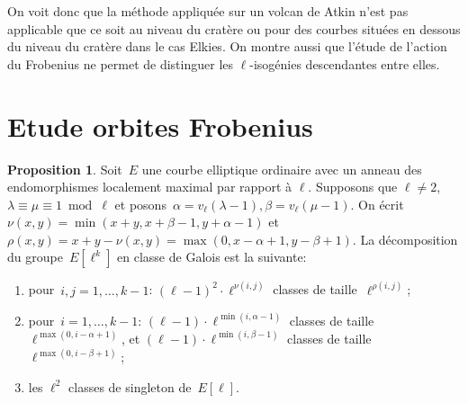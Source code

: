\documentclass[10pt,a4paper]{book}
\theoremstyle{plain}
\theoremstyle{definition}
\theoremstyle{definition}
\theoremstyle{definition}
\newtheorem{prop}[thm]{Proposition}
\theoremstyle{definition}
\theoremstyle{remark}
\theoremstyle{remark}
\theoremstyle{definition}
\begin{document}
On voit donc que la méthode appliquée sur un volcan de Atkin n'est pas 
applicable que ce soit au niveau du cratère ou pour des courbes situées en 
dessous du niveau du cratère dans le cas Elkies. On montre aussi que l'étude de
l'action du Frobenius ne permet de distinguer les $\ell$-isogénies descendantes
entre elles.

\section{Etude orbites Frobenius}
\begin{prop}\label{prop:orbites-l-torsion}
Soit~$E$ une courbe elliptique ordinaire avec un anneau des endomorphismes 
localement maximal  par rapport à $\ell$.
Supposons que $\ell \neq 2$, $\lambda \equiv \mu \equiv 1 \bmod \ell$ et posons~$\alpha = v_{\ell}(\lambda-1), \beta=v_{\ell}(\mu-1)$.
On écrit~$\nu(x, y) = \min (x+y, x+\beta-1, y+\alpha-1)$
et~$\rho(x, y) = x+y - \nu(x, y) = \max (0, x-\alpha+1, y-\beta+1)$.
La décomposition du groupe~$E[\ell^k]$ en classe de Galois est la suivante:
\begin{enumerate}
\item pour~$i, j = 1, …, k-1$:
$(\ell-1)^2 \cdot \ell^{\nu(i,j)}$ classes de taille~$\ell^{\rho(i,j)}$;
\item pour~$i = 1, …, k-1$:
$(\ell-1) \cdot \ell^{\min (i, \alpha-1)}$ classes de taille~$\ell^{\max (0, i-\alpha+1)}$, et
$(\ell-1) \cdot \ell^{\min (i, \beta-1)}$ classes de taille~$\ell^{\max (0, i-\beta+1)}$;
\item les $\ell^2$ classes de singleton de~$E[\ell]$.
\end{enumerate}
\end{prop}
\end{document}
